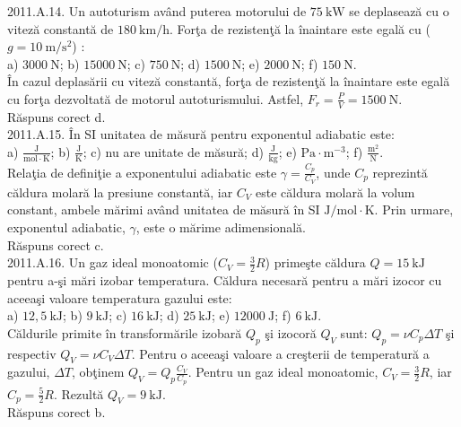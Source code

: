 2011.A.14. Un autoturism având puterea motorului de $75 \mathrm{~kW}$ se deplasează cu o viteză constantă de $180 \mathrm{~km} / \mathrm{h}$. Forţa de rezistenţă la înaintare este egală cu ($g=10 \mathrm{~m} / \mathrm{s}^{2}$) :\\ a) $3000 \mathrm{~N}$; b) $15000 \mathrm{~N}$; c) $750 \mathrm{~N}$; d) $1500 \mathrm{~N}$; e) $2000 \mathrm{~N}$; f) $150 \mathrm{~N}$.\\ În cazul deplasării cu viteză constantă, forţa de rezistenţă la înaintare este egală cu forţa dezvoltată de motorul autoturismului. Astfel, $F_{r}=\frac{P}{V}=1500 \mathrm{~N}$.\\ Răspuns corect d.\\

2011.A.15. În SI unitatea de măsură pentru exponentul adiabatic este:\\ a) $\frac{\mathrm{J}}{\mathrm{mol} \cdot \mathrm{K}}$; b) $\frac{\mathrm{J}}{\mathrm{K}}$; c) nu are unitate de măsură; d) $\frac{\mathrm{J}}{\mathrm{kg}}$; e) $\mathrm{Pa} \cdot \mathrm{m}^{-3}$; f) $\frac{\mathrm{m}^{2}}{\mathrm{N}}$.\\ Relaţia de definiţie a exponentului adiabatic este $\gamma=\frac{C_{p}}{C_{V}}$, unde $C_{p}$ reprezintă căldura molară la presiune constantă, iar $C_{V}$ este căldura molară la volum constant, ambele mărimi având unitatea de măsură în SI $\mathrm{J} / \mathrm{mol} \cdot \mathrm{K}$. Prin urmare, exponentul adiabatic, $\gamma$, este o mărime adimensională.\\ Răspuns corect c.\\

2011.A.16. Un gaz ideal monoatomic ($C_{V}=\frac{3}{2} R$) primeşte căldura $Q=15 \mathrm{~kJ}$ pentru a-şi mări izobar temperatura. Căldura necesară pentru a mări izocor cu aceeaşi valoare temperatura gazului este:\\ a) $12,5 \mathrm{~kJ}$; b) $9 \mathrm{~kJ}$; c) $16 \mathrm{~kJ}$; d) $25 \mathrm{~kJ}$; e) $12000 \mathrm{~J}$; f) $6 \mathrm{~kJ}$.\\ Căldurile primite în transformările izobară $Q_{p}$ şi izocoră $Q_{V}$ sunt: $Q_{p}=\nu C_{p} \Delta T$ şi respectiv $Q_{V}=\nu C_{V} \Delta T$. Pentru o aceeaşi valoare a creşterii de temperatură a gazului, $\Delta T$, obţinem $Q_{V}=Q_{p} \frac{C_{V}}{C_{p}}$. Pentru un gaz ideal monoatomic, $C_{V}=\frac{3}{2} R$, iar $C_{p}=\frac{5}{2} R$. Rezultă $Q_{V}=9 \mathrm{~kJ}$.\\ Răspuns corect b.\\

